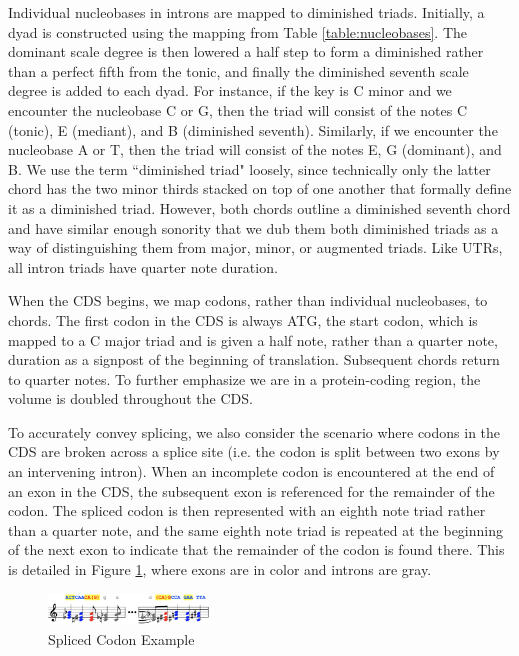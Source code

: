 \documentclass[letterpaper]{article}
\begin{document}
Individual nucleobases in introns are mapped to diminished triads. Initially, a dyad is constructed using the mapping from Table \ref{table:nucleobases}. The dominant scale degree is then lowered a half step to form a diminished rather than a perfect fifth from the tonic, and finally the diminished seventh scale degree is added to each dyad. For instance, if the key is C minor and we encounter the nucleobase C or G, then the triad will consist of the notes C (tonic), E\musFlat \; (mediant), and B\musDoubleFlat\; (diminished seventh). Similarly, if we encounter the nucleobase A or T, then the triad will consist of the notes E\musFlat, G\musFlat \; (dominant), and B\musDoubleFlat. We use the term ``diminished triad" loosely, since technically only the latter chord has the two minor thirds stacked on top of one another that formally define it as a diminished triad. However, both chords outline a diminished seventh chord and have similar enough  sonority that we dub them both diminished triads as a way of distinguishing them from major, minor, or augmented triads. Like UTRs, all intron triads have quarter note duration. 

When the CDS begins, we map codons, rather than individual nucleobases, to chords. The first codon in the CDS is always ATG, the start codon, which is mapped to a C major triad and is given a half note, rather than a quarter note, duration as a signpost of the beginning of translation. Subsequent chords return to quarter notes. To further emphasize we are in a protein-coding region, the volume is doubled throughout the CDS. 

To accurately convey splicing, we also consider the scenario where codons in the CDS are broken across a splice site (i.e. the codon is split between two exons by an intervening intron). When an incomplete codon is encountered at the end of an exon in the CDS, the subsequent exon is referenced for the remainder of the codon. The spliced codon is then represented with an eighth note triad rather than a quarter note, and the same eighth note triad is repeated at the beginning of the next exon to indicate that the remainder of the codon is found there. This is detailed in Figure \ref{fig:splice_site_example}, where exons are in color and introns are gray. 

\begin{figure}[h!]
\centering
\vspace{-3mm}
\includegraphics[width=0.38\textwidth]{images/splice_site_example}
  \caption{Spliced Codon Example}
  \label{fig:splice_site_example}
  \vspace{-3mm}
\end{figure}
\end{document}
